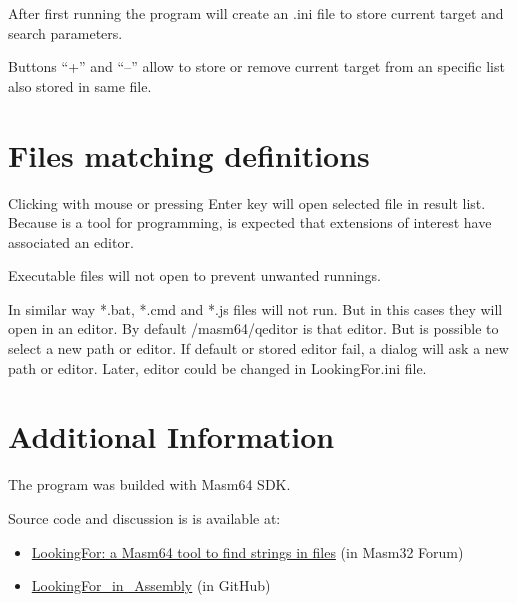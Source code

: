 \documentclass[11pt,a4paper]{scrartcl}
\begin{document}
	After first running the program will create an .ini file to store current target and search parameters.
	
	Buttons ``+'' and ``--'' allow to store or remove current target from an specific list also stored in same file. 

\section {Files matching definitions}
	
	Clicking with mouse or pressing Enter key will open selected file in result list. Because is a tool for programming, is expected that extensions of interest have associated an editor.
	
	Executable files will not open to prevent unwanted runnings. 
	
	In similar way *.bat, *.cmd and *.js files will not run. But in this cases they will open in an editor. By default /masm64/qeditor is that editor. But is possible to select a new path or editor. If default or stored editor fail, a dialog will ask a new path or editor. Later, editor could be changed in LookingFor.ini file.
	
\section{Additional Information}

	The program was builded with Masm64 SDK.
	
	Source code and discussion is is available at:
    \begin{itemize}
	
	\item \href{https://masm32.com/board/index.php?topic=11888.0}{LookingFor: a Masm64 tool to find strings in files} (in Masm32 Forum) 
	\item \href{https://github.com/ASMHSE/LookingFor-in-Assembly}{LookingFor\_in\_Assembly} (in GitHub) 
     \end{itemize}
	

\thispagestyle{empty}
\end{document}
